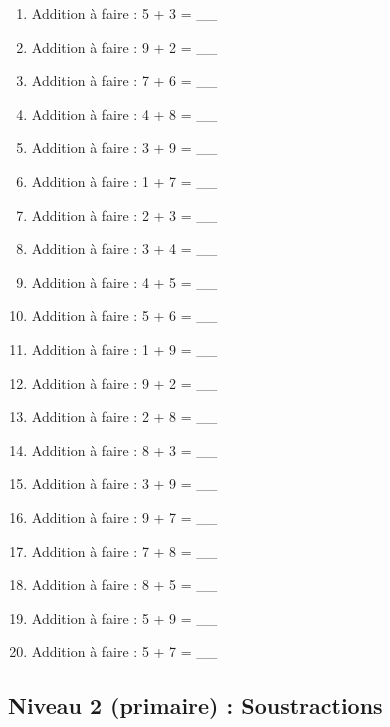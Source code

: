 \documentclass[11pt]{article}
\begin{document}
\begin{enumerate}
\item Addition à faire : 5 + 3 = \_\_
\item Addition à faire : 9 + 2 = \_\_
\item Addition à faire : 7 + 6 = \_\_
\item Addition à faire : 4 + 8 = \_\_
\item Addition à faire : 3 + 9 = \_\_
\item Addition à faire : 1 + 7 = \_\_
\item Addition à faire : 2 + 3 = \_\_
\item Addition à faire : 3 + 4 = \_\_
\item Addition à faire : 4 + 5 = \_\_
\item Addition à faire : 5 + 6 = \_\_
\item Addition à faire : 1 + 9 = \_\_
\item Addition à faire : 9 + 2 = \_\_
\item Addition à faire : 2 + 8 = \_\_
\item Addition à faire : 8 + 3 = \_\_
\item Addition à faire : 3 + 9 = \_\_
\item Addition à faire : 9 + 7 = \_\_
\item Addition à faire : 7 + 8 = \_\_
\item Addition à faire : 8 + 5 = \_\_
\item Addition à faire : 5 + 9 = \_\_
\item Addition à faire : 5 + 7 = \_\_
\end{enumerate}

\subsection{Niveau 2 (primaire) : Soustractions}
\label{sec:org0e9fd53}


\label{orgeead96c}
\end{document}
